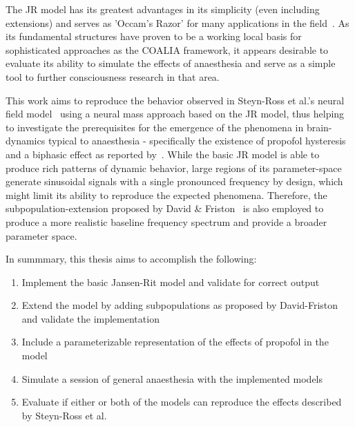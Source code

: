 The JR model has its greatest advantages in its simplicity (even including extensions) and serves as 'Occam's Razor'
for many applications in the field~\cite{kuhlmann_neural_2016}.
As its fundamental structures have proven to be a working local basis for sophisticated approaches as the COALIA
framework,
it appears desirable to evaluate its ability to simulate the effects of anaesthesia and serve as a simple tool to
further consciousness research in that area.

This work aims to reproduce the behavior observed in Steyn-Ross et al.'s neural field model~\cite{hutt_progress_2011}
using a neural mass approach based on the JR model,
thus helping to investigate the prerequisites for the emergence of the phenomena in brain-dynamics typical to
anaesthesia - specifically the existence of propofol hysteresis
and a biphasic effect as reported by~\cite{hutt_progress_2011}.
While the basic JR model is able to produce rich patterns of dynamic behavior,
large regions of its parameter-space generate sinusoidal signals with a single pronounced frequency by design,
which might limit its ability to reproduce the expected phenomena.
Therefore, the subpopulation-extension proposed by David \& Friston~\cite{david_neural_2003} is also employed to
produce a more realistic baseline frequency spectrum and provide a broader parameter space.

\vspace{1em}
\noindent In summmary, this thesis aims to accomplish the following:
\begin{enumerate}[label=\textbf{Goal \arabic*}:, ref=\textbf{Goal~\arabic*}, align=left, leftmargin=*]
    \item Implement the basic Jansen-Rit model and validate for correct output\label{goal:jr_model}
    \item Extend the model by adding subpopulations as proposed by David-Friston and validate the implementation\label{goal:df_model}
    \item Include a parameterizable representation of the effects of propofol in the model \label{goal:implement_propofol}
    \item Simulate a session of general anaesthesia with the implemented models \label{goal:sim_ga}
    \item Evaluate if either or both of the models can reproduce the effects described by Steyn-Ross et al. \label{goal:evaluate}
\end{enumerate}



